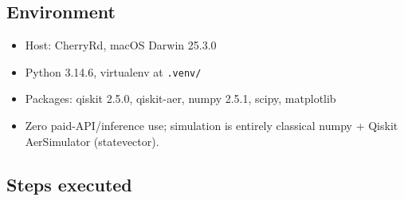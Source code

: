 \documentclass[11pt]{article}
\begin{document}
\subsection{Environment}
\begin{itemize}\itemsep-2pt
  \item Host: CherryRd, macOS Darwin 25.3.0
  \item Python 3.14.6, virtualenv at \texttt{.venv/}
  \item Packages: qiskit 2.5.0, qiskit-aer, numpy 2.5.1, scipy, matplotlib
  \item Zero paid-API/inference use; simulation is entirely classical numpy + Qiskit AerSimulator (statevector).
\end{itemize}

\subsection{Steps executed}
\end{document}
